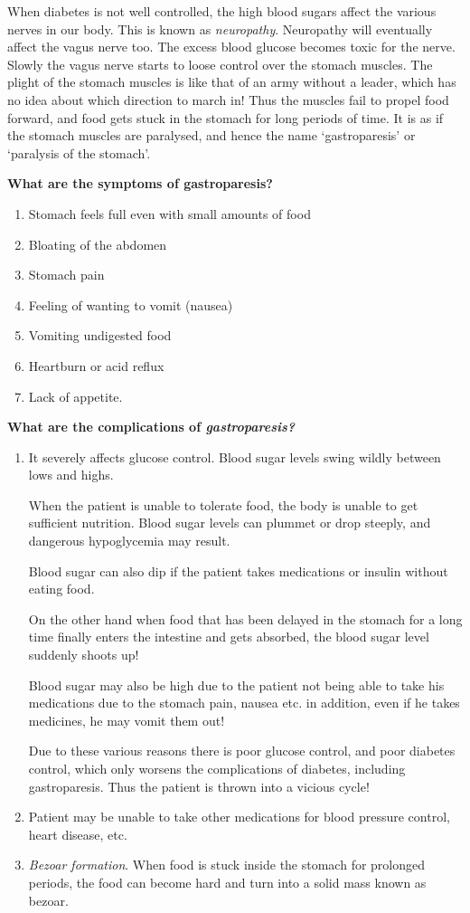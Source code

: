 When diabetes is not well controlled, the high blood sugars affect the various nerves in our body. This is known as \textit{neuropathy}. Neuro\-pathy will eventually affect the vagus nerve too. The excess blood glu\-cose becomes toxic for the nerve. Slowly the vagus nerve starts to loose control over the stomach muscles. The plight of the stomach muscles is like that of an army without a leader, which has no idea about which direction to march in! Thus the muscles fail to propel food forward, and food gets stuck in the stomach for long periods of time. It is as if the stomach muscles are paralysed, and hence the name ‘gastroparesis’ or ‘paralysis of the stomach’.

\noindent\textbf{What are the symptoms of gastroparesis?}
\begin{enumerate}[•]
\itemsep=0pt
\item Stomach feels full even with small amounts of food
\item Bloating of the abdomen
\item Stomach pain
\item Feeling of wanting to vomit (nausea)
\item Vomiting undigested food
\item Heartburn or acid reflux
\item Lack of appetite.
\end{enumerate}

\noindent\textbf{What are the complications of \textit{gastroparesis?}}

\begin{enumerate}[\ding{118}] 
\itemsep=0pt
\item It severely affects glucose control. Blood sugar levels swing wildly between lows and highs.

When the patient is unable to tolerate food, the body is unable to get sufficient nutrition. Blood sugar levels can plummet or drop steeply, and dangerous hypoglycemia may result.

Blood sugar can also dip if the patient takes medications or insulin without eating food.

On the other hand when food that has been delayed in the stomach for a long time finally enters the intestine and gets absorbed, the blood sugar level suddenly shoots up!

Blood sugar may also be high due to the patient not being able to take his medications due to the stomach pain, nausea etc. in addition, even if he takes medicines, he may vomit them out!

Due to these various reasons there is poor glucose control, and poor diabetes control, which only worsens the complications of diabetes, including gastroparesis. Thus the patient is thrown into a vicious cycle!
\item Patient may be unable to take other medications for blood pressure control, heart disease, etc.
\item \textit{Bezoar formation}. When food is stuck inside the stomach for prolonged periods, the food can become hard and turn into a solid mass known as bezoar.
\end{enumerate}


